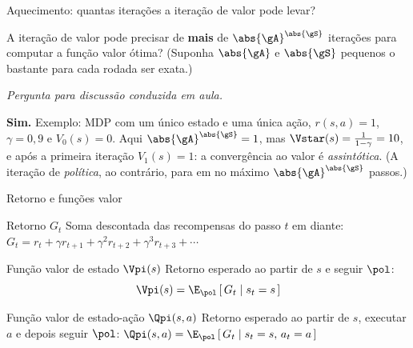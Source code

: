 \documentclass[aspectratio=169, 11pt]{beamer}
\newcommand{\paradiscussao}{\vspace{-0.2em}
  {\footnotesize\color{rlCinza}\itshape Pergunta para discussão conduzida em aula.}}
\begin{document}
\begin{frame}{Aquecimento: quantas iterações a iteração de valor pode levar?}
  \begin{quizbox}{}
    A iteração de valor pode precisar de \textbf{mais} de
    $\abs{\gA}^{\abs{\gS}}$ iterações para computar a função valor ótima?
    (Suponha $\abs{\gA}$ e $\abs{\gS}$ pequenos o bastante para cada rodada
    ser exata.)
  \end{quizbox}
  \paradiscussao

  \pause
  \begin{respbox}
    \textbf{Sim.} Exemplo: MDP com um único estado e uma única ação,
    $r(s,a) = 1$, $\gamma = 0{,}9$ e $V_0(s) = 0$. Aqui
    $\abs{\gA}^{\abs{\gS}} = 1$, mas $\Vstar(s) = \tfrac{1}{1-\gamma} = 10$,
    e após a primeira iteração $V_1(s) = 1$: a convergência ao valor é
    \emph{assintótica}. (A iteração de \emph{política}, ao contrário, para
    em no máximo $\abs{\gA}^{\abs{\gS}}$ passos.)
  \end{respbox}
\end{frame}

\begin{frame}{Retorno e funções valor}
  \begin{defbox}{Retorno $G_t$}
    Soma descontada das recompensas do passo $t$ em diante:
    $G_t = r_t + \gamma r_{t+1} + \gamma^2 r_{t+2} + \gamma^3 r_{t+3} + \cdots$
  \end{defbox}

  \begin{defbox}{Função valor de estado $\Vpi(s)$}
    Retorno esperado ao partir de $s$ e seguir $\pol$:
    \[ \Vpi(s) = \E_{\pol}\left[\, G_t \mid s_t = s \,\right] \]
  \end{defbox}

  \begin{defbox}{Função valor de estado-ação $\Qpi(s,a)$}
    Retorno esperado ao partir de $s$, executar $a$ e depois seguir $\pol$:
    $\Qpi(s,a) = \E_{\pol}\left[\, G_t \mid s_t = s,\, a_t = a \,\right]$
  \end{defbox}
\end{frame}
\end{document}
